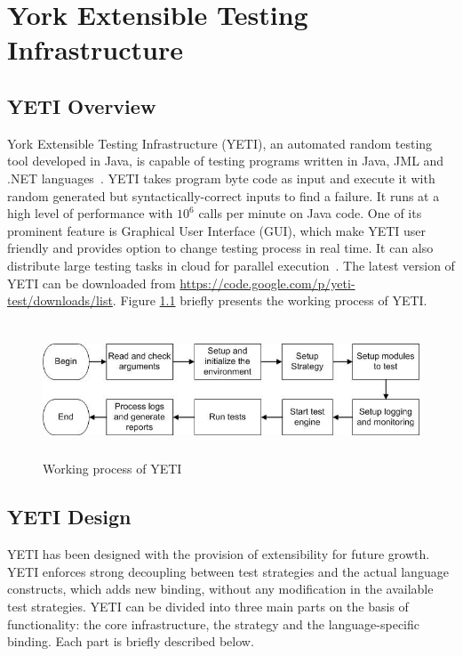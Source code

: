 
\chapter{York Extensible Testing Infrastructure}
\label{chap:yeti_3}




\section{YETI Overview}
York Extensible Testing Infrastructure (YETI), an automated random testing tool developed in Java, is capable of testing programs written in Java, JML and .NET languages~\cite{oriol2010testing}. YETI takes program byte code as input and execute it with random generated but syntactically-correct inputs to find a failure. It runs at a high level of performance with $10^6$ calls per minute on Java code. One of its prominent feature is Graphical User Interface (GUI), which make YETI user friendly and provides option to change testing process in real time. It can also distribute large testing tasks in cloud for parallel execution~\cite{oriol2010yeti}. The latest version of YETI can be downloaded from \url{https://code.google.com/p/yeti-test/downloads/list}. Figure \ref{fig:yetiOverview} briefly presents the working process of YETI. 
\begin{figure}[h]
	\centering
	\includegraphics[width=15cm, height=4cm]{chapter3/yetiOverview.png}
	\caption{Working process of YETI}
	\label{fig:yetiOverview}
\end{figure}


\section{YETI Design}
YETI has been designed with the provision of extensibility for future growth. YETI enforces strong decoupling between test strategies and the actual language constructs, which adds new binding, without any modification in the available test strategies. YETI can be divided into three main parts on the basis of functionality: the core infrastructure, the strategy and the language-specific binding. Each part is briefly described below. 

